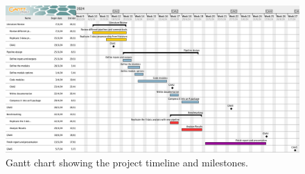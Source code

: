 \documentclass[ENG, BIB]{TFUOC}%
\begin{document}
\begin{figure}[htbp]
    \centering
    \includegraphics[width=\textwidth]{Images/gantt.png}
    \caption{Gantt chart showing the project timeline and milestones.}
    \label{fig:gantt}
\end{figure}

\end{document}

